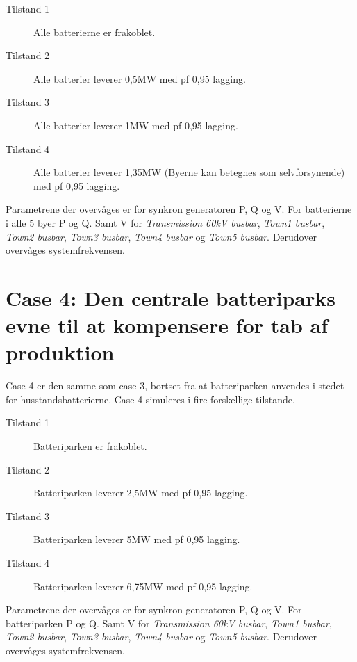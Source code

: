 \begin{description}
	\item[Tilstand 1] Alle batterierne er frakoblet.
	\item[Tilstand 2] Alle batterier leverer 0,5MW med pf 0,95 lagging.
	\item[Tilstand 3] Alle batterier leverer 1MW med pf 0,95 lagging.
	\item[Tilstand 4] Alle batterier leverer 1,35MW (Byerne kan betegnes som selvforsynende) med pf 0,95 lagging.
\end{description}

Parametrene der overvåges er for synkron generatoren P, Q og V.
For batterierne i alle 5 byer P og Q. Samt V for \textit{Transmission 60kV busbar}, \textit{Town1 busbar}, \textit{Town2 busbar}, \textit{Town3 busbar}, \textit{Town4 busbar} og \textit{Town5 busbar}.
Derudover overvåges systemfrekvensen.

\section{Case 4: Den centrale batteriparks evne til at kompensere for tab af produktion}
\label{SimCase4}
Case 4 er den samme som case 3, bortset fra at batteriparken anvendes i stedet for husstandsbatterierne.
Case 4 simuleres i fire forskellige tilstande.

\begin{description}
	\item[Tilstand 1] Batteriparken er frakoblet.
	\item[Tilstand 2] Batteriparken leverer 2,5MW med pf 0,95 lagging.
	\item[Tilstand 3] Batteriparken leverer 5MW med pf 0,95 lagging.
	\item[Tilstand 4] Batteriparken leverer 6,75MW med pf 0,95 lagging.
\end{description}

Parametrene der overvåges er for synkron generatoren P, Q og V.
For batteriparken P og Q. Samt V for \textit{Transmission 60kV busbar}, \textit{Town1 busbar}, \textit{Town2 busbar}, \textit{Town3 busbar}, \textit{Town4 busbar} og \textit{Town5 busbar}.
Derudover overvåges systemfrekvensen.
